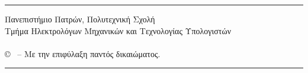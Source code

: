 \pagestyle{empty}

\vspace*{\fill}
\hrule
\begin{flushleft}
	Πανεπιστήμιο Πατρών, Πολυτεχνική Σχολή \\
	Τμήμα Ηλεκτρολόγων Μηχανικών και Τεχνολογίας Υπολογιστών \\
	\me \\
	© \monthyear \ -- Με την επιφύλαξη παντός δικαιώματος.\\
\end{flushleft}
\hrule
